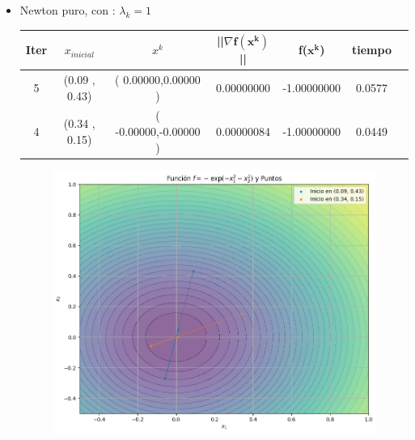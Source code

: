 
\begin{itemize}
    \item Newton puro, con : $\lambda_k = 1$
\begin{table}[H]
\centering
\renewcommand{\arraystretch}{1.2} 
\begin{tabular}{|c|c|c|c|c|c|c|}
\hline
\textbf{Iter} & \textbf{$x_{inicial}$} &\textbf{$x^k$} & \textbf{||$\nabla \mathbf{f(x^k)}$}|| & \textbf{f($\mathbf{x^k}$)} & \textbf{tiempo} \\
\hline
5  &  (0.09 , 0.43) &( 0.00000,0.00000 ) & 0.00000000 & -1.00000000 & 0.0577 \\
4  &  (0.34 , 0.15) &( -0.00000,-0.00000 ) & 0.00000084 & -1.00000000 & 0.0449 \\\hline
\end{tabular}
\end{table}

\begin{figure}
    \centering
    \includegraphics[width=0.65\linewidth]{figuras/PREG5_NEW.png}
    \label{fig:enter-label}
\end{figure}




\end{itemize}
